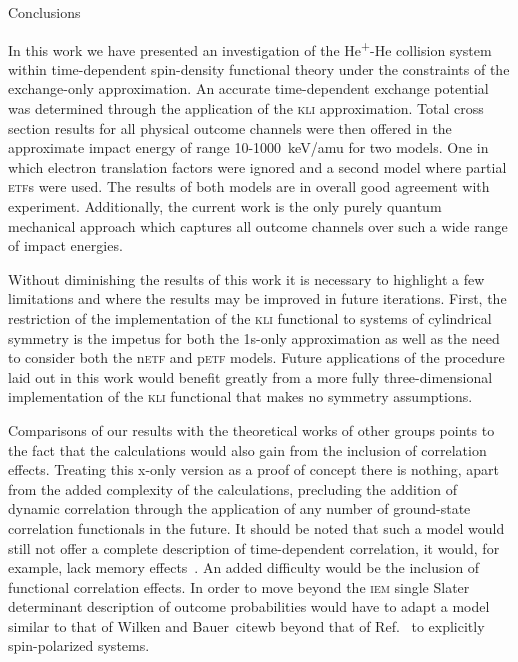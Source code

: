 \documentclass[aps, pra, reprint, groupedaddress, amsfonts, longbibliography,
               amsmath, amssymb, showpacs, nofootinbib]{revtex4-1}
\begin{document}
\begin{section}{Conclusions \label{sec:conc}}

   In this work we have presented an investigation of the He\textsuperscript{+}-He collision system
   within  time-dependent spin-density functional theory under the constraints of the exchange-only
   approximation. An accurate time-dependent exchange potential was determined through the application
   of the \textsc{kli} approximation. Total cross section results for all physical outcome channels were
   then offered in the approximate impact energy of range 10-1000~keV/amu for two models. One in which
   electron translation factors were ignored and a second model where partial \textsc{etf}s were used.
   The results of both models are in overall good agreement with experiment. Additionally, the current
   work is the only purely quantum mechanical approach which captures all outcome channels over such a
   wide range of impact energies.

   Without diminishing the results of this work it is necessary to highlight a few limitations and where
   the results may be improved in future iterations. First, the restriction of the implementation of the 
   \textsc{kli} functional to systems of cylindrical symmetry is the impetus for both the 1s-only
   approximation as well as the need to consider both the n\textsc{etf} and p\textsc{etf} models. Future
   applications of the procedure laid out in this work would benefit greatly from a more fully
   three-dimensional implementation of the \textsc{kli} functional that makes no symmetry assumptions.

   Comparisons of our results with the theoretical works of other groups points to the fact that the
   calculations would also gain from the inclusion of correlation effects. Treating this x-only version
   as a proof of concept there is nothing, apart from the added complexity of the calculations,
   precluding the addition of dynamic correlation through the application of any number of ground-state
   correlation functionals in the future. It should be noted that such a model would still not offer a
   complete description of time-dependent correlation, it would, for example, lack memory
   effects~\cite{tddft}. An added difficulty would be the inclusion of functional correlation effects.
   In order to move beyond the \textsc{iem} single Slater determinant description of outcome
   probabilities would have to adapt a model similar to that of Wilken and Bauer~cite{wb} beyond that of
   Ref.~\cite{p-he2p-he} to explicitly spin-polarized systems.

\end{section}
\end{document}
